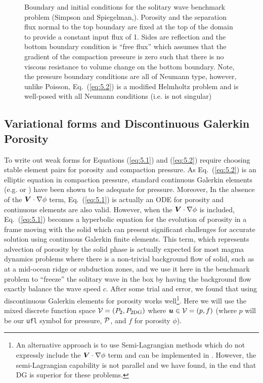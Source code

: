\begin{figure}[htbp!]
  \centering
  \def\svgwidth{.8\textwidth}
  
  \caption{Boundary and initial conditions for the solitary wave
    benchmark problem (Simpson and
    Spiegelman,\cite{simpson_solitary_2011}). Porosity and the
    separation flux normal to the top boundary are fixed at the top of
    the domain to provide  a constant input flux of 1.
  Sides are reflection and the bottom boundary condition is ``free
  flux'' which assumes that the gradient of the compaction pressure is
zero such that there is no viscous resistance to volume change on the
bottom boundary. Note, the pressure boundary conditions are all of
Neumann type,  however, unlike Poisson,  Eq.\ (\ref{eq:5.2}) is a
modified Helmholtz problem and is well-posed with all Neumann
conditions (i.e. is not singular)}
  \label{fig:solitarywavebcs}
\end{figure}


\subsection{Variational forms and Discontinuous Galerkin Porosity}
\label{sec:variational-forms}

To write out weak forms for Equations (\ref{eq:5.1}) and
(\ref{eq:5.2}) require choosing stable element pairs for porosity and
compaction pressure.  As Eq.\ (\ref{eq:5.2}) is an elliptic equation
in compaction pressure, standard continuous Galerkin elements (e.g. \Pone
or \Ptwo) have been shown to be adequate for pressure.  Moreover, In the
absence of the ${\mbox{\boldmath$V$}}\cdot\nabla\phi$ term, Eq.\ (\ref{eq:5.1}) is
actually an ODE for porosity and continuous elements are also valid.
However, when the ${\mbox{\boldmath$V$}}\cdot\nabla\phi$ is included, Eq.\ (\ref{eq:5.1})
becomes a hyperbolic equation for the evolution of porosity in a frame
moving with the solid which can present significant challenges for
accurate solution using continuous Galerkin finite elements.  This term, which
represents advection of porosity by the solid phase is actually
expected for most magma dynamics problems where there is a non-trivial
background flow of solid, such as at a mid-ocean ridge or subduction
zones, and we use it here in the benchmark problem to ``freeze'' the
solitary wave in the box by having the background flow exactly balance
the wave speed $c$.  After some trial and error, we found that using
discontinuous Galerkin elements for porosity works well\footnote{An
  alternative approach is to use Semi-Lagrangian methods which do not
  expressly include the ${\mbox{\boldmath$V$}}\cdot\nabla\phi$ term and can be
  implemented in \TF{}.  However, the semi-Lagrangian capability is
  not parallel and we have found, in the end that DG is superior for
  these problems.}.  Here we
will use the mixed discrete function space $\mathcal{V}=(P_2,P_{2\mathrm{DG}})$
where ${\mbox{\boldmath$u$}}\in\mathcal{V}=(p,f)$ (where $p$ will be our  \texttt{ufl}
symbol for pressure, $\mathcal{P}$, and $f$ for porosity $\phi$).

